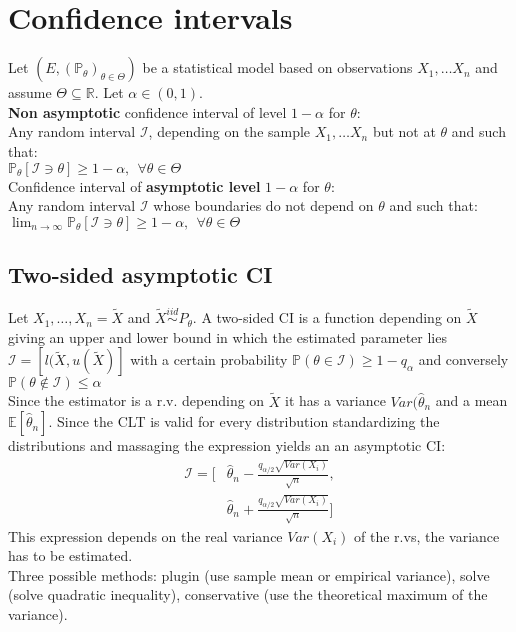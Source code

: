 \section{Confidence intervals}
Let $\displaystyle ( E,(\mathbb{P}_{\theta })_{\theta \in \Theta })$ be a statistical  model based on observations $X_{1} , \ldots X_{n}$  and assume $\displaystyle \Theta \subseteq \mathbb{R}$. Let $\displaystyle \alpha \in ( 0,1)$.\\
\textbf{Non asymptotic} confidence interval of level $\displaystyle 1-\alpha $ for $\displaystyle \theta $:\\
Any random interval $\displaystyle \mathcal{I}$, depending on the sample $X_{1} , \ldots X_{n}$ but not at $\displaystyle \theta $ and such that:\\
$\mathbb{P}_{\theta }[\mathcal{I} \ni \theta ] \geq 1-\alpha ,\ \ \forall \theta \in \Theta$\\
Confidence interval of \textbf{asymptotic level} $\displaystyle 1-\alpha $  for $\displaystyle \theta $:\\
Any random interval $\displaystyle \mathcal{I}$ whose boundaries do not depend on $\displaystyle \theta $ and such that: $\lim _{n\rightarrow \infty }\mathbb{P}_{\theta } [\mathcal{I} \ni \theta ]\geq 1-\alpha ,\ \ \forall \theta \in \Theta $
\subsection{Two-sided asymptotic CI}
Let $X_1, \ldots, X_n = \tilde{X}$ and $\tilde{X}\stackrel{iid} {\sim} P_{\theta}$. A two-sided CI is a function depending on $\tilde{X}$ giving an upper and lower bound in which the estimated parameter lies $\mathcal{I} = [l(\tilde{X},u(\tilde{X})]$ with a certain probability $\mathbb{P}(\theta \in  \mathcal{I}) \geq 1 -q_{\alpha}$ and conversely $\mathbb{P}(\theta \not\in  \mathcal{I}) \leq \alpha$\\
Since the estimator is a r.v. depending on $\tilde{X}$ it has a variance $Var(\hat{\theta}_n$ and a mean $\mathbb{E}[\hat{\theta}_n]$. 
Since the CLT is valid for every distribution standardizing the distributions and massaging the expression yields an an asymptotic CI:
\begin{align*}
\mathcal{I} =  [&\hat{\theta}_n - \frac{q_{\alpha /2} \sqrt{Var(X_i)} }{\sqrt{n}},\\
&\hat{\theta}_n + \frac{q_{\alpha /2} \sqrt{Var(X_i)} }{\sqrt{n}}]
\end{align*}
This expression depends on the real variance $Var(X_i)$ of the r.vs, the variance has to be estimated.\\
Three possible methods: plugin (use sample mean or empirical variance), solve (solve quadratic inequality), conservative (use the theoretical maximum of the variance).

